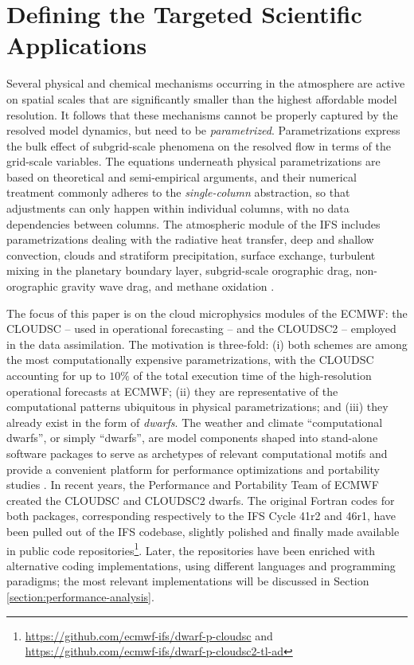 \documentclass[../main.tex]{subfiles}
\begin{document}
    \justifying

    \section{Defining the Targeted Scientific Applications}
    \label{section:target-cloud-microphysics-schemes}

        Several physical and chemical mechanisms occurring in the atmosphere are active on spatial scales that are significantly smaller than the highest affordable model resolution. It follows that these mechanisms cannot be properly captured by the resolved model dynamics, but need to be \emph{parametrized}. Parametrizations express the bulk effect of subgrid-scale phenomena on the resolved flow in terms of the grid-scale variables. The equations underneath physical parametrizations are based on theoretical and semi-empirical arguments, and their numerical treatment commonly adheres to the \emph{single-column} abstraction, so that adjustments can only happen within individual columns, with no data dependencies between columns. The atmospheric module of the IFS includes parametrizations dealing with the radiative heat transfer, deep and shallow convection, clouds and stratiform precipitation, surface exchange, turbulent mixing in the planetary boundary layer, subgrid-scale orographic drag, non-orographic gravity wave drag, and methane oxidation \citep{ifs48r1}.

        The focus of this paper is on the cloud microphysics modules of the ECMWF: the CLOUDSC -- used in operational forecasting -- and the CLOUDSC2 -- employed in the data assimilation. The motivation is three-fold: (i) both schemes are among the most computationally expensive parametrizations, with the CLOUDSC accounting for up to $10\%$ of the total execution time of the high-resolution operational forecasts at ECMWF; (ii) they are representative of the computational patterns ubiquitous in physical parametrizations; and (iii) they already exist in the form of \emph{dwarfs}. The weather and climate ``computational dwarfs'', or simply ``dwarfs'', are model components shaped into stand-alone software packages to serve as archetypes of relevant computational motifs \citep{muller19} and provide a convenient platform for performance optimizations and portability studies \citep{bauer20}. In recent years, the Performance and Portability Team of ECMWF created the CLOUDSC and CLOUDSC2 dwarfs. The original Fortran codes for both packages, corresponding respectively to the IFS Cycle 41r2 and 46r1, have been pulled out of the IFS codebase, slightly polished and finally made available in public code repositories\footnote{\url{https://github.com/ecmwf-ifs/dwarf-p-cloudsc} and \url{https://github.com/ecmwf-ifs/dwarf-p-cloudsc2-tl-ad}}. Later, the repositories have been enriched with alternative coding implementations, using different languages and programming paradigms; the most relevant implementations will be discussed in Section \ref{section:performance-analysis}.
\end{document}
